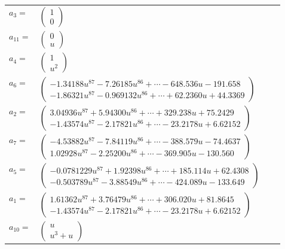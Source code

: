 \documentclass[1p]{elsarticle_modified}
\theoremstyle{definition}
\begin{document}
\begin{tabular}{m{7pt} m{180pt} m{7pt} m{180pt} }
\flushright $a_{3}=$&$\begin{pmatrix}1\\0\end{pmatrix}$ \\
\flushright $a_{11}=$&$\begin{pmatrix}0\\u\end{pmatrix}$ \\
\flushright $a_{4}=$&$\begin{pmatrix}1\\u^2\end{pmatrix}$ \\
\flushright $a_{6}=$&$\begin{pmatrix}-1.34188 u^{87}-7.26185 u^{86}+\cdots-648.536 u-191.658\\-1.86321 u^{87}-0.969132 u^{86}+\cdots+62.2360 u+44.3369\end{pmatrix}$ \\
\flushright $a_{2}=$&$\begin{pmatrix}3.04936 u^{87}+5.94300 u^{86}+\cdots+329.238 u+75.2429\\-1.43574 u^{87}-2.17821 u^{86}+\cdots-23.2178 u+6.62152\end{pmatrix}$ \\
\flushright $a_{7}=$&$\begin{pmatrix}-4.53882 u^{87}-7.84119 u^{86}+\cdots-388.579 u-74.4637\\1.02928 u^{87}-2.25200 u^{86}+\cdots-369.905 u-130.560\end{pmatrix}$ \\
\flushright $a_{5}=$&$\begin{pmatrix}-0.0781229 u^{87}+1.92398 u^{86}+\cdots+185.114 u+62.4308\\-0.503789 u^{87}-3.88549 u^{86}+\cdots-424.089 u-133.649\end{pmatrix}$ \\
\flushright $a_{1}=$&$\begin{pmatrix}1.61362 u^{87}+3.76479 u^{86}+\cdots+306.020 u+81.8645\\-1.43574 u^{87}-2.17821 u^{86}+\cdots-23.2178 u+6.62152\end{pmatrix}$ \\
\flushright $a_{10}=$&$\begin{pmatrix}u\\u^3+u\end{pmatrix}$ \\

\end{tabular}
\end{document}
